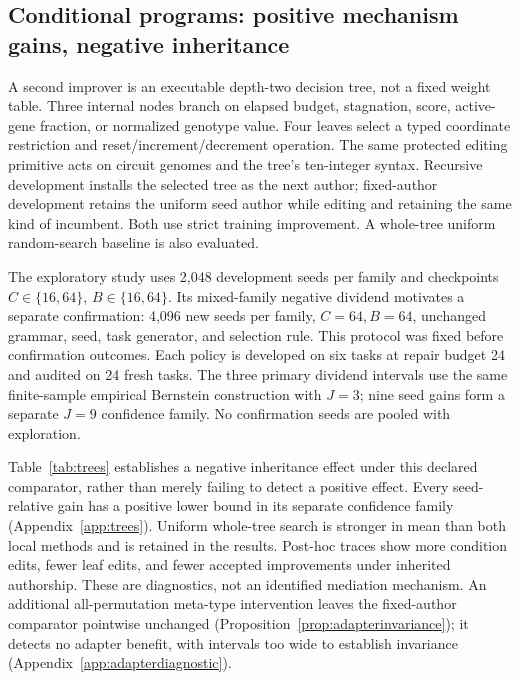 \documentclass{article}
\theoremstyle{definition}
\begin{document}
\subsection{Conditional programs: positive mechanism gains, negative inheritance}\label{sec:trees}
A second improver is an executable depth-two decision tree, not a fixed weight table. Three internal nodes branch on elapsed budget, stagnation, score, active-gene fraction, or normalized genotype value. Four leaves select a typed coordinate restriction and reset/increment/decrement operation. The same protected editing primitive acts on circuit genomes and the tree's ten-integer syntax. Recursive development installs the selected tree as the next author; fixed-author development retains the uniform seed author while editing and retaining the same kind of incumbent. Both use strict training improvement. A whole-tree uniform random-search baseline is also evaluated.

The exploratory study uses 2,048 development seeds per family and checkpoints $C\in\{16,64\}$, $B\in\{16,64\}$. Its mixed-family negative dividend motivates a separate confirmation: 4,096 new seeds per family, $C=64,B=64$, unchanged grammar, seed, task generator, and selection rule. This protocol was fixed before confirmation outcomes. Each policy is developed on six tasks at repair budget 24 and audited on 24 fresh tasks. The three primary dividend intervals use the same finite-sample empirical Bernstein construction with $J=3$; nine seed gains form a separate $J=9$ confidence family. No confirmation seeds are pooled with exploration.

\begin{table}[t]
\centering
\caption{Conditional-tree independent confirmation: percentage-point effects on fresh tasks. Both local development methods improve over the seed, but all three simultaneous dividend intervals are strictly negative.}
\label{tab:trees}

\end{table}

Table~\ref{tab:trees} establishes a negative inheritance effect under this declared comparator, rather than merely failing to detect a positive effect. Every seed-relative gain has a positive lower bound in its separate confidence family (Appendix~\ref{app:trees}). Uniform whole-tree search is stronger in mean than both local methods and is retained in the results. Post-hoc traces show more condition edits, fewer leaf edits, and fewer accepted improvements under inherited authorship. These are diagnostics, not an identified mediation mechanism. An additional all-permutation meta-type intervention leaves the fixed-author comparator pointwise unchanged (Proposition~\ref{prop:adapterinvariance}); it detects no adapter benefit, with intervals too wide to establish invariance (Appendix~\ref{app:adapterdiagnostic}).
\end{document}
